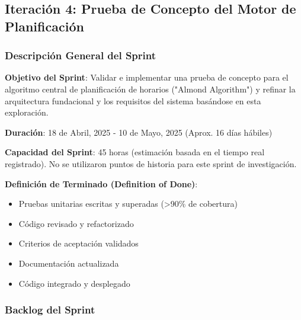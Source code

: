 \subsection{Iteración 4: Prueba de Concepto del Motor de Planificación}

\subsubsection{Descripción General del Sprint}

\textbf{Objetivo del Sprint}: Validar e implementar una prueba de concepto para el algoritmo central de planificación de horarios ("Almond Algorithm") y refinar la arquitectura fundacional y los requisitos del sistema basándose en esta exploración.

\textbf{Duración}: 18 de Abril, 2025 - 10 de Mayo, 2025 (Aprox. 16 días hábiles)

\textbf{Capacidad del Sprint}: 45 horas (estimación basada en el tiempo real registrado). No se utilizaron puntos de historia para este sprint de investigación.

\textbf{Definición de Terminado (Definition of Done)}: 
\begin{itemize}
    \item Pruebas unitarias escritas y superadas (>90\% de cobertura)
    \item Código revisado y refactorizado
    \item Criterios de aceptación validados
    \item Documentación actualizada
    \item Código integrado y desplegado
\end{itemize}

\subsubsection{Backlog del Sprint}


